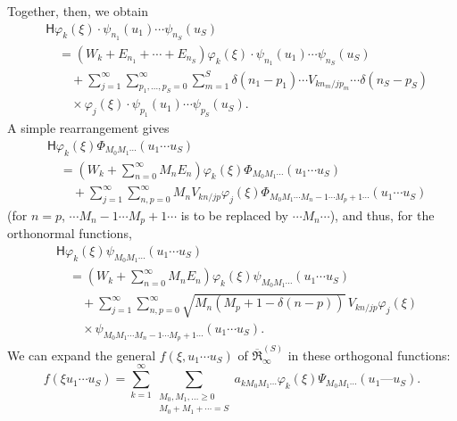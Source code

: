 \documentclass[fontsize=13pt,twoside,openany,headings=normal,parskip=false,bookmarkpackage=false,DIV=calc]{scrbook}
\begin{document}
Together, then, we obtain
\begin{align*}
 &\mathsf{H}\varphi_k(\xi)\cdot\psi_{n_1}(u_1)\cdots\psi_{n_S}(u_S)\\
 &\quad=(W_k+E_{n_1}+\cdots+E_{n_S})\varphi_k(\xi)\cdot\psi_{n_1}(u_1)\cdots\psi_{n_S}(u_S)\\
 &\qquad{}+\sum_{j=1}^{\infty}\sum_{p_1,\ldots,p_S=0}^{\infty}\sum_{m=1}^{S}
 \delta(n_1-p_1)\cdots V_{kn_m/jp_m}\cdots\delta(n_S-p_S)\\
 &\qquad{}\times\varphi_j(\xi)\cdot\psi_{p_1}(u_1)\cdots\psi_{p_S}(u_S).
\end{align*}
A simple rearrangement gives
\begin{align*}
 &\mathsf{H}\varphi_k(\xi)\Phi_{M_0M_1\cdots}(u_1\cdots u_S)\\
 &\quad=\left(W_k+\sum_{n=0}^{\infty}M_nE_n\right)\varphi_k(\xi)\Phi_{M_0M_1\cdots}(u_1\cdots u_S)\\
 &\qquad{}+\sum_{j=1}^{\infty}\sum_{n,p=0}^{\infty}M_nV_{kn/jp}\varphi_j(\xi)
 \Phi_{M_0M_1\cdots M_n-1\cdots M_p+1\cdots}(u_1\cdots u_S)
\end{align*}
(for $n=p$, $\cdots M_n-1\cdots M_p+1\cdots$ is to be replaced by $\cdots M_n\cdots$), and thus, for the orthonormal functions,
\begin{align*}
 &\mathsf{H}\varphi_k(\xi)\psi_{M_0M_1\cdots}(u_1\cdots u_S)\\
 &\quad=\left(W_k+\sum_{n=0}^{\infty}M_nE_n\right)\varphi_k(\xi)\psi_{M_0M_1\cdots}(u_1\cdots u_S)\\
 &\qquad{}+\sum_{j=1}^{\infty}\sum_{n,p=0}^{\infty}\sqrt{M_n(M_p+1-\delta(n-p))}\,V_{kn/jp}\varphi_j(\xi)\\
 &\qquad{}\times\psi_{M_0M_1\cdots M_n-1\cdots M_p+1\cdots}(u_1\cdots u_S).
\end{align*}
We can expand the general $f(\xi,u_1\cdots u_S)$ of $\overline{\mathfrak R}_{\infty}^{(S)}$ in these orthogonal \hypertarget{origpage-149}{}functions:
\[
 f(\xi u_1\cdots u_S)=\sum_{k=1}^{\infty}
 \sum_{\substack{M_0,M_1,\ldots\ge0\\M_0+M_1+\cdots=S}}
 a_{kM_0M_1\cdots}\varphi_k(\xi)\Psi_{M_0M_1\cdots}(u_1\text{---}u_S).
\]
\end{document}
